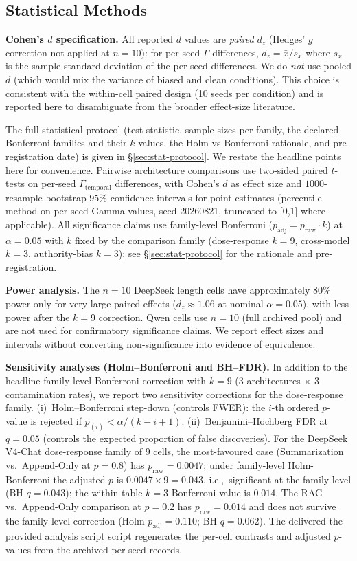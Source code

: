 \documentclass[11pt]{article}
\begin{document}
\subsection{Statistical Methods}

\textbf{Cohen's $d$ specification.} All reported $d$ values are \emph{paired} $d_z$ (Hedges' $g$ correction not applied at $n=10$): for per-seed $\Gamma$ differences, $d_z = \bar{x} / s_x$ where $s_x$ is the sample standard deviation of the per-seed differences. We do \emph{not} use pooled $d$ (which would mix the variance of biased and clean conditions). This choice is consistent with the within-cell paired design (10 seeds per condition) and is reported here to disambiguate from the broader effect-size literature.

The full statistical protocol (test statistic, sample sizes per family, the declared Bonferroni families and their $k$ values, the Holm-vs-Bonferroni rationale, and pre-registration date) is given in \S\ref{sec:stat-protocol}. We restate the headline points here for convenience. Pairwise architecture comparisons use two-sided paired $t$-tests on per-seed $\Gamma_{\text{temporal}}$ differences, with Cohen's $d$ as effect size and $1000$-resample bootstrap $95\%$ confidence intervals for point estimates (percentile method on per-seed Gamma values, seed 20260821, truncated to [0,1] where applicable). All significance claims use family-level Bonferroni ($p_{\text{adj}} = p_{\text{raw}} \cdot k$) at $\alpha = 0.05$ with $k$ fixed by the comparison family (dose-response $k=9$, cross-model $k=3$, authority-bias $k=3$); see \S\ref{sec:stat-protocol} for the rationale and pre-registration.

\textbf{Power analysis.} The $n=10$ DeepSeek length cells have approximately 80\% power only for very large paired effects ($d_z\approx1.06$ at nominal $\alpha=0.05$), with less power after the $k=9$ correction. Qwen cells use $n=10$ (full archived pool) and are not used for confirmatory significance claims. We report effect sizes and intervals without converting non-significance into evidence of equivalence.

\noindent\textbf{Sensitivity analyses (Holm--Bonferroni and BH--FDR).} In addition to the headline family-level Bonferroni correction with $k=9$ (3 architectures $\times$ 3 contamination rates), we report two sensitivity corrections for the dose-response family. (i)~Holm--Bonferroni step-down (controls FWER): the $i$-th ordered $p$-value is rejected if $p_{(i)} < \alpha / (k - i + 1)$. (ii)~Benjamini--Hochberg FDR at $q=0.05$ (controls the expected proportion of false discoveries). For the DeepSeek V4-Chat dose-response family of $9$ cells, the most-favoured case (Summarization vs.\ Append-Only at $p=0.8$) has $p_{\text{raw}}=0.0047$; under family-level Holm-Bonferroni the adjusted $p$ is $0.0047 \times 9 = 0.043$, i.e.,\ significant at the family level (BH $q = 0.043$); the within-table $k{=}3$ Bonferroni value is $0.014$. The RAG vs.\ Append-Only comparison at $p=0.2$ has $p_{\text{raw}}=0.014$ and does not survive the family-level correction (Holm $p_{\text{adj}}=0.110$; BH $q=0.062$). The delivered the provided analysis script script regenerates the per-cell contrasts and adjusted $p$-values from the archived per-seed records.
\end{document}
